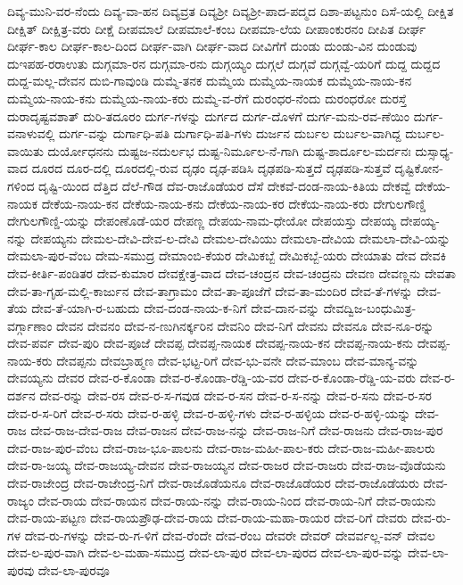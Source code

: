 {ದಿವ್ಯ-ಮುನಿ-ವರ-ನೆಂದು
ದಿವ್ಯ-ವಾ-ಹನ
ದಿವ್ಯವ್ರತ
ದಿವ್ಯಶ್ರೀ
ದಿವ್ಯಶ್ರೀ-ಪಾದ-ಪದ್ಮದ
ದಿಶಾ-ಪಟ್ಟನುಂ
ದಿಸೆ-ಯಲ್ಲಿ
ದೀಕ್ಷಿತ
ದೀಕ್ಷಿತ್
ದೀಕ್ಷಿತ್ರ-ವರು
ದೀಕ್ಷೆ
ದೀಪಮಾಲೆ
ದೀಪಮಾಲೆ-ಕಂಬ
ದೀಪಮಾ-ಲೆಯ
ದೀಪಾಂಕುರನಂ
ದೀಪಿತ
ದೀರ್ಘ
ದೀರ್ಘ-ಕಾಲ
ದೀರ್ಘ-ಕಾಲ-ದಿಂದ
ದೀರ್ಘ-ವಾಗಿ
ದೀರ್ಘ-ವಾದ
ದೀವಿಗೆಗೆ
ದುಂಡು
ದುಂಡು-ವಿನ
ದುಂಡುವು
ದುಇಪಹ-ರರಾಉತು
ದುಗ್ಗಮಾ-ರನ
ದುಗ್ಗಮಾ-ರನು
ದುಗ್ಗಯ್ಯಂ
ದುಗ್ಗಲೆ
ದುಗ್ಗವೆ
ದುಗ್ಗವ್ವೆ-ಯರಿಗೆ
ದುದ್ದ
ದುದ್ದದ
ದುದ್ದ-ಮಲ್ಲ-ದೇವನ
ದುಬಿ-ಗಾವುಂಡಿ
ದುಮ್ಮೆ-ತನಕ
ದುಮ್ಮೆಯ
ದುಮ್ಮೆಯ-ನಾಯಕ
ದುಮ್ಮೆಯ-ನಾಯ-ಕನ
ದುಮ್ಮೆಯ-ನಾಯ-ಕನು
ದುಮ್ಮೆಯ-ನಾಯ-ಕರು
ದುಮ್ಮೆ-ವ-ರೆಗೆ
ದುರಂಧರ-ನೆಂದು
ದುರಂಧರೋ
ದುರಸ್ತೆ
ದುರಾದೃಷ್ಟವಶಾತ್
ದುರಿ-ತದೂರಂ
ದುರ್ಗ-ಗಳನ್ನು
ದುರ್ಗದ
ದುರ್ಗ-ದೊಳಗೆ
ದುರ್ಗ-ಮನು-ರವ-ಣೆಯಿಂ
ದುರ್ಗ-ವನಾಳುವಲ್ಲಿ
ದುರ್ಗ-ವನ್ನು
ದುರ್ಗಾಧಿ-ಪತಿ
ದುರ್ಗಾಧಿ-ಪತಿ-ಗಳು
ದುರ್ಜನ
ದುರ್ಬಲ
ದುರ್ಬಲ-ವಾಗಿದ್ದ
ದುರ್ಬಲ-ವಾಯಿತು
ದುರ್ಯೋಧನನು
ದುಷ್ಟಜ-ನದುರ್ಲಭ
ದುಷ್ಟ-ನಿರ್ಮೂಲ-ನೆ-ಗಾಗಿ
ದುಷ್ಟ-ಶಾರ್ದೂಲ-ಮರ್ದನಃ
ದುಸ್ಸಾಧ್ಯ-ವಾದ
ದೂರದ
ದೂರ-ದಲ್ಲಿ
ದೂರದಲ್ಲಿ-ರುವ
ದೃಢಂ
ದೃಢ-ಪಡಿಸಿ
ದೃಢಪಡಿ-ಸುತ್ತದೆ
ದೃಢಪಡಿ-ಸುತ್ತವೆ
ದೃಷ್ಟಿಕೋನ-ಗಳಿಂದ
ದೃಷ್ಟಿ-ಯಿಂದ
ದೆತ್ತಿದ
ದೆಲೆ-ಗೌಡ
ದೆವ-ರಾಜೊಡೆಯರ
ದೆಸೆ
ದೇಕವೆ-ದಂಡ-ನಾಯ-ಕಿತಿಯ
ದೇಕವ್ವೆ
ದೇಕೆಯ-ನಾಯಕ
ದೇಕೆಯ-ನಾಯ-ಕನ
ದೇಕೆಯ-ನಾಯ-ಕನು
ದೇಕೆಯ-ನಾಯ-ಕರ
ದೇಕೆಯ-ನಾಯ-ಕರು
ದೇಗುಲಗೌಣ್ಡಿ
ದೇಗುಲಗೌಣ್ಡಿ-ಯನ್ನು
ದೇಪಂಣೊಡೆ-ಯರ
ದೇಪಣ್ಣ
ದೇಪಯ-ನಾಮ-ಧೇಯೋ
ದೇಪಯಸ್ತು
ದೇಪಯ್ಯ
ದೇಪಯ್ಯ-ನನ್ನು
ದೇಪಯ್ಯನು
ದೇಮಲ-ದೇವಿ-ದೇವ-ಲ-ದೇವಿ
ದೇಮಲ-ದೇವಿಯು
ದೇಮಲಾ-ದೇವಿಯ
ದೇಮಲಾ-ದೇವಿ-ಯನ್ನು
ದೇಮಲಾ-ಪುರ-ವೆಂಬ
ದೇಮ-ಸಮುದ್ರ
ದೇಮಾಂಬಿ-ಕೆಯರ
ದೇಮಿಕಬ್ಬೆ
ದೇಮಿಕಬ್ಬೆ-ಯರು
ದೇಯಾತು
ದೇವ
ದೇವಕಿ
ದೇವ-ಕೀರ್ತಿ-ಪಂಡಿತರ
ದೇವ-ಕುಮಾರ
ದೇವಕ್ಷೇತ್ರ-ವಾದ
ದೇವ-ಚಂದ್ರನ
ದೇವ-ಚಂದ್ರನು
ದೇವಣ
ದೇವಣ್ಣನು
ದೇವತಾ
ದೇವ-ತಾ-ಗೃಹ-ಮಲ್ಲಿ-ಕಾರ್ಜುನ
ದೇವ-ತಾಗ್ರಾಮಂ
ದೇವ-ತಾ-ಪೂಜೆಗೆ
ದೇವ-ತಾ-ಮಂದಿರ
ದೇವ-ತೆ-ಗಳನ್ನು
ದೇವ-ತೆಯ
ದೇವ-ತೆ-ಯಾಗಿ-ರ-ಬಹುದು
ದೇವ-ದಂಡ-ನಾಯ-ಕ-ನಿಗೆ
ದೇವ-ದಾನ-ವನ್ನು
ದೇವದ್ವಿಜ-ಬಂಧುಮಿತ್ರ-ವರ್ಗ್ಗಾಣಾಂ
ದೇವನ
ದೇವನಂ
ದೇವ-ನ-ಣುಗಿನರ್ಕ್ಕರಿನ
ದೇವನಿಂ
ದೇವ-ನಿಗೆ
ದೇವನು
ದೇವನೂ
ದೇವ-ನೂ-ರನ್ನು
ದೇವ-ಪರ್ವ
ದೇವ-ಪುರಿ
ದೇವ-ಪೂಜೆ
ದೇವಪ್ಪ
ದೇವಪ್ಪ-ನಾಯಕ
ದೇವಪ್ಪ-ನಾಯ-ಕನ
ದೇವಪ್ಪ-ನಾಯ-ಕನು
ದೇವಪ್ಪ-ನಾಯ-ಕರು
ದೇವಪ್ಪನು
ದೇವಬ್ರಾಹ್ಮಣ
ದೇವ-ಭಟ್ಟ-ರಿಗೆ
ದೇವ-ಭು-ವನೇ
ದೇವ-ಮಾಂಬ
ದೇವ-ಮಾನ್ಯ-ವನ್ನು
ದೇವಯ್ಯನು
ದೇವರ
ದೇವ-ರ-ಕೊಂಡಾ
ದೇವ-ರ-ಕೊಂಡಾ-ರೆಡ್ಡಿ-ಯ-ವರ
ದೇವ-ರ-ಕೊಂಡಾ-ರೆಡ್ಡಿ-ಯ-ವರು
ದೇವ-ರ-ದರ್ಶನ
ದೇವ-ರನ್ನು
ದೇವ-ರಸ
ದೇವ-ರ-ಸ-ಗವುಡ
ದೇವ-ರ-ಸನ
ದೇವ-ರ-ಸ-ನನ್ನು
ದೇವ-ರ-ಸನು
ದೇವ-ರ-ಸರ
ದೇವ-ರ-ಸ-ರಿಗೆ
ದೇವ-ರ-ಸರು
ದೇವ-ರ-ಹಳ್ಳಿ
ದೇವ-ರ-ಹಳ್ಳಿ-ಗಳು
ದೇವ-ರ-ಹಳ್ಳಿಯ
ದೇವ-ರ-ಹಳ್ಳಿ-ಯನ್ನು
ದೇವ-ರಾಜ
ದೇವ-ರಾಜ-ದೇವ-ರಾಜ
ದೇವ-ರಾಜನ
ದೇವ-ರಾಜ-ನನ್ನು
ದೇವ-ರಾಜ-ನಿಗೆ
ದೇವ-ರಾಜನು
ದೇವ-ರಾಜ-ಪುರ
ದೇವ-ರಾಜ-ಪುರ-ವೆಂಬ
ದೇವ-ರಾಜ-ಭೂ-ಪಾಲನು
ದೇವ-ರಾಜ-ಮಹೀ-ಪಾಲ-ಕರು
ದೇವ-ರಾಜ-ಮಹೀ-ಪಾಲರು
ದೇವ-ರಾ-ಜಯ್ಯ
ದೇವ-ರಾಜಯ್ಯ-ದೇವನ
ದೇವ-ರಾಜಯ್ಯನ
ದೇವ-ರಾಜರ
ದೇವ-ರಾಜರು
ದೇವ-ರಾಜ-ವೊಡೆಯನು
ದೇವ-ರಾಜೇಂದ್ರ
ದೇವ-ರಾಜೇಂದ್ರ-ನಿಗೆ
ದೇವ-ರಾಜೊಡೆಯನೂ
ದೇವ-ರಾಜೊಡೆಯರ
ದೇವ-ರಾಜೊಡೆಯರು
ದೇವ-ರಾಜ್ಯಂ
ದೇವ-ರಾಯ
ದೇವ-ರಾಯನ
ದೇವ-ರಾಯ-ನನ್ನು
ದೇವ-ರಾಯ-ನಿಂದ
ದೇವ-ರಾಯ-ನಿಗೆ
ದೇವ-ರಾಯನು
ದೇವ-ರಾಯ-ಪಟ್ಟಣ
ದೇವ-ರಾಯಪ್ರೌಢ-ದೇವ-ರಾಯ
ದೇವ-ರಾಯ-ಮಹಾ-ರಾಯರ
ದೇವ-ರಿಗೆ
ದೇವರು
ದೇವ-ರು-ಗಳ
ದೇವ-ರು-ಗಳನ್ನು
ದೇವ-ರು-ಗ-ಳಿಗೆ
ದೇವ-ರೆಂದೇ
ದೇವ-ರೆಂಬ
ದೇವರೇ
ದೇವರ್
ದೇವರ್ವಲ್ಲ-ವನ್
ದೇವಲ
ದೇವ-ಲ-ಪುರ-ವಾಗಿ
ದೇವ-ಲ-ಮಹಾ-ಸಮುದ್ರ
ದೇವ-ಲಾ-ಪುರ
ದೇವ-ಲಾ-ಪುರದ
ದೇವ-ಲಾ-ಪುರ-ವನ್ನು
ದೇವ-ಲಾ-ಪುರವು
ದೇವ-ಲಾ-ಪುರವೂ
}
